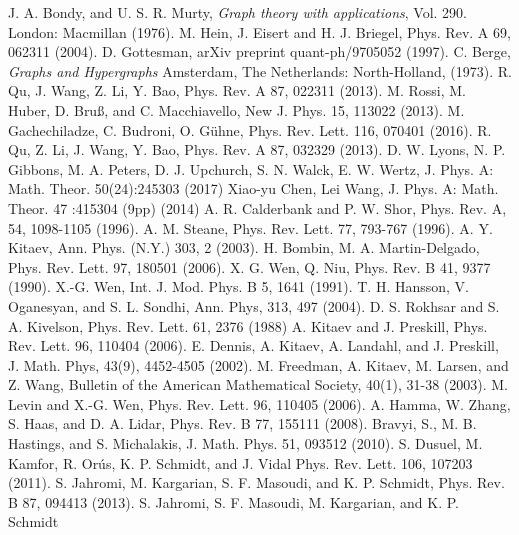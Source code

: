\documentclass[preprintnumbers, showpacs, floatfix,twocolumn,
preprintnumbers, superscriptaddress]{revtex4}
\begin{document}
\begin{thebibliography}{99}
J. A. Bondy, and U. S. R. Murty, \emph{Graph theory with applications}, Vol. 290. London: Macmillan (1976).
M. Hein, J. Eisert and H. J. Briegel, Phys. Rev. A 69, 062311 (2004).
D. Gottesman, arXiv preprint quant-ph/9705052 (1997).
C. Berge, \emph{Graphs and Hypergraphs} Amsterdam, The
Netherlands: North-Holland, (1973).
R. Qu, J. Wang, Z. Li, Y. Bao, Phys. Rev. A 87, 022311 (2013).
M. Rossi, M. Huber, D. Bruß, and C. Macchiavello, New J. Phys. 15, 113022 (2013).
M. Gachechiladze, C. Budroni, O. G\"{u}hne, Phys. Rev. Lett. 116, 070401 (2016).
R. Qu, Z. Li, J. Wang, Y. Bao, Phys. Rev. A 87, 032329 (2013).
D. W. Lyons, N. P. Gibbons, M. A. Peters, D. J. Upchurch, S. N. Walck, E. W. Wertz, J. Phys. A: Math. Theor. 50(24):245303 (2017)
Xiao-yu Chen, Lei Wang, J. Phys. A: Math. Theor. 47 :415304 (9pp) (2014)
A. R. Calderbank and P. W. Shor, Phys. Rev. A, 54, 1098-1105 (1996).
A. M. Steane,  Phys. Rev. Lett. 77, 793-767 (1996).
A. Y. Kitaev, Ann. Phys. (N.Y.) 303, 2 (2003).
H. Bombin, M. A. Martin-Delgado, Phys. Rev. Lett. 97, 180501 (2006).
X. G. Wen, Q. Niu, Phys. Rev. B 41, 9377 (1990).
X.-G. Wen, Int. J. Mod. Phys. B 5, 1641 (1991).
T. H. Hansson, V. Oganesyan, and S. L. Sondhi, Ann. Phys, 313, 497 (2004).
D. S. Rokhsar and S. A. Kivelson, Phys. Rev. Lett. 61, 2376 (1988)
A. Kitaev and J. Preskill, Phys. Rev. Lett. 96, 110404 (2006).
E. Dennis, A. Kitaev, A. Landahl, and J. Preskill, J. Math. Phys, 43(9), 4452-4505 (2002).
M. Freedman, A. Kitaev, M. Larsen, and Z. Wang, Bulletin of the American Mathematical Society, 40(1), 31-38 (2003).
M. Levin and X.-G. Wen, Phys. Rev. Lett. 96, 110405 (2006).
A. Hamma, W. Zhang, S. Haas, and D. A. Lidar, Phys. Rev. B 77, 155111 (2008).
Bravyi, S., M. B. Hastings, and S. Michalakis, J. Math. Phys. 51, 093512 (2010).
S. Dusuel, M. Kamfor, R. Or\'{u}s, K. P. Schmidt, and J. Vidal Phys. Rev. Lett. 106, 107203 (2011).
S. Jahromi, M. Kargarian, S. F. Masoudi, and K. P. Schmidt, Phys. Rev. B 87, 094413 (2013).
S. Jahromi, S. F. Masoudi, M. Kargarian, and K. P. Schmidt

\end{thebibliography}
\end{document}
